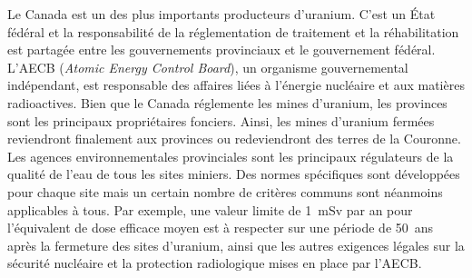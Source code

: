 \documentclass{article}
\begin{document}
Le Canada est un des plus importants producteurs d'uranium. C'est un État fédéral et la responsabilité de la réglementation de traitement et la réhabilitation est partagée entre les gouvernements provinciaux et le gouvernement fédéral.
L'AECB (\textit{Atomic Energy Control Board}), un organisme gouvernemental indépendant, est responsable des affaires liées à l'énergie nucléaire et aux matières radioactives. 
Bien que le Canada réglemente les mines d'uranium, les provinces sont les principaux propriétaires fonciers. Ainsi, les mines d'uranium fermées reviendront finalement aux provinces ou redeviendront des terres de la Couronne. Les agences environnementales provinciales sont les principaux régulateurs de la qualité de l'eau de tous les sites miniers.
Des normes spécifiques sont développées pour chaque site mais un certain nombre de critères communs sont néanmoins applicables à tous.
Par exemple, une valeur limite de 1~mSv par an pour l'équivalent de dose efficace moyen est à respecter sur une période de 50~ans après la fermeture des sites d'uranium, ainsi que les autres exigences légales sur la sécurité nucléaire et la protection radiologique mises en place par l'AECB.
\end{document}
